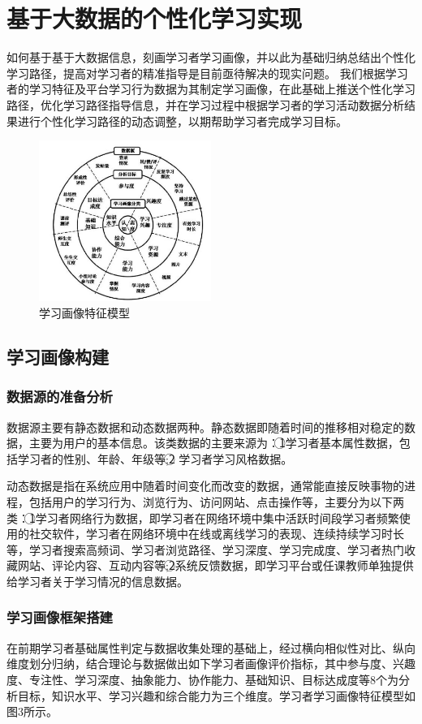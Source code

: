 \documentclass[UTF8]{ctexart}
\begin{document}
	\section{基于大数据的个性化学习实现}
		如何基于基于大数据信息，刻画学习者学习画像，并以此为基础归纳总结出个性化学习路径，提高对学习者的精准指导是目前亟待解决的现实问题。
		我们根据学习者的学习特征及平台学习行为数据为其制定学习画像，在此基础上推送个性化学习路径，优化学习路径指导信息，并在学习过程中根据学习者的学习活动数据分析结果进行个性化学习路径的动态调整，以期帮助学习者完成学习目标。
	\begin{figure}[H]
		\centering
		\includegraphics[width=0.5\textwidth]{xuexihuaxiang}
		\caption{学习画像特征模型}
		\end{figure}
		\subsection{学习画像构建}
			\subsubsection{\textbf{数据源的准备分析}}
		数据源主要有静态数据和动态数据两种。静态数据即随着时间的推移相对稳定的数据，主要为用户的基本信息。该类数据的主要来源为：\textcircled{1}学习者基本属性数据，包括学习者的性别、年龄、年级等;\textcircled{2} 学习者学习风格数据。

		动态数据是指在系统应用中随着时间变化而改变的数据，通常能直接反映事物的进程，包括用户的学习行为、浏览行为、访问网站、点击操作等，主要分为以下两类：\textcircled{1}学习者网络行为数据，即学习者在网络环境中集中活跃时间段学习者频繁使用的社交软件，学习者在网络环境中在线或离线学习的表现、连续持续学习时长等，学习者搜索高频词、学习者浏览路径、学习深度、学习完成度、学习者热门收藏网站、评论内容、互动内容等;\textcircled{2}系统反馈数据，即学习平台或任课教师单独提供给学习者关于学习情况的信息数据。
			\subsubsection{\textbf{学习画像框架搭建}}
		在前期学习者基础属性判定与数据收集处理的基础上，经过横向相似性对比、纵向维度划分归纳，结合理论与数据做出如下学习者画像评价指标，其中参与度、兴趣度、专注性、学习深度、抽象能力、协作能力、基础知识、目标达成度等8个为分析目标，知识水平、学习兴趣和综合能力为三个维度。学习者学习画像特征模型如图3所示。
	
\end{document}
